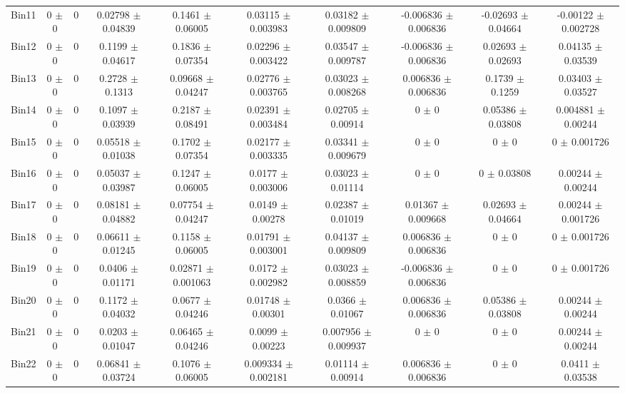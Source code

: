 \begin{tabular}{@{\extracolsep{4pt}}lccccccccc@{}}
     Bin11 & 0 $\pm$ 0 & 0 & 0.02798 $\pm$ 0.04839 & 0.1461 $\pm$ 0.06005 & 0.03115 $\pm$ 0.003983 & 0.03182 $\pm$ 0.009809 & -0.006836 $\pm$ 0.006836 & -0.02693 $\pm$ 0.04664 & -0.00122 $\pm$ 0.002728 \\ 
     Bin12 & 0 $\pm$ 0 & 0 & 0.1199 $\pm$ 0.04617 & 0.1836 $\pm$ 0.07354 & 0.02296 $\pm$ 0.003422 & 0.03547 $\pm$ 0.009787 & -0.006836 $\pm$ 0.006836 & 0.02693 $\pm$ 0.02693 & 0.04135 $\pm$ 0.03539 \\ 
     Bin13 & 0 $\pm$ 0 & 0 & 0.2728 $\pm$ 0.1313 & 0.09668 $\pm$ 0.04247 & 0.02776 $\pm$ 0.003765 & 0.03023 $\pm$ 0.008268 & 0.006836 $\pm$ 0.006836 & 0.1739 $\pm$ 0.1259 & 0.03403 $\pm$ 0.03527 \\ 
     Bin14 & 0 $\pm$ 0 & 0 & 0.1097 $\pm$ 0.03939 & 0.2187 $\pm$ 0.08491 & 0.02391 $\pm$ 0.003484 & 0.02705 $\pm$ 0.00914 & 0 $\pm$ 0 & 0.05386 $\pm$ 0.03808 & 0.004881 $\pm$ 0.00244 \\ 
     Bin15 & 0 $\pm$ 0 & 0 & 0.05518 $\pm$ 0.01038 & 0.1702 $\pm$ 0.07354 & 0.02177 $\pm$ 0.003335 & 0.03341 $\pm$ 0.009679 & 0 $\pm$ 0 & 0 $\pm$ 0 & 0 $\pm$ 0.001726 \\ 
     Bin16 & 0 $\pm$ 0 & 0 & 0.05037 $\pm$ 0.03987 & 0.1247 $\pm$ 0.06005 & 0.0177 $\pm$ 0.003006 & 0.03023 $\pm$ 0.01114 & 0 $\pm$ 0 & 0 $\pm$ 0.03808 & 0.00244 $\pm$ 0.00244 \\ 
     Bin17 & 0 $\pm$ 0 & 0 & 0.08181 $\pm$ 0.04882 & 0.07754 $\pm$ 0.04247 & 0.0149 $\pm$ 0.00278 & 0.02387 $\pm$ 0.01019 & 0.01367 $\pm$ 0.009668 & 0.02693 $\pm$ 0.04664 & 0.00244 $\pm$ 0.001726 \\ 
     Bin18 & 0 $\pm$ 0 & 0 & 0.06611 $\pm$ 0.01245 & 0.1158 $\pm$ 0.06005 & 0.01791 $\pm$ 0.003001 & 0.04137 $\pm$ 0.009809 & 0.006836 $\pm$ 0.006836 & 0 $\pm$ 0 & 0 $\pm$ 0.001726 \\ 
     Bin19 & 0 $\pm$ 0 & 0 & 0.0406 $\pm$ 0.01171 & 0.02871 $\pm$ 0.001063 & 0.0172 $\pm$ 0.002982 & 0.03023 $\pm$ 0.008859 & -0.006836 $\pm$ 0.006836 & 0 $\pm$ 0 & 0 $\pm$ 0.001726 \\ 
     Bin20 & 0 $\pm$ 0 & 0 & 0.1172 $\pm$ 0.04032 & 0.0677 $\pm$ 0.04246 & 0.01748 $\pm$ 0.00301 & 0.0366 $\pm$ 0.01067 & 0.006836 $\pm$ 0.006836 & 0.05386 $\pm$ 0.03808 & 0.00244 $\pm$ 0.00244 \\ 
     Bin21 & 0 $\pm$ 0 & 0 & 0.0203 $\pm$ 0.01047 & 0.06465 $\pm$ 0.04246 & 0.0099 $\pm$ 0.00223 & 0.007956 $\pm$ 0.009937 & 0 $\pm$ 0 & 0 $\pm$ 0 & 0.00244 $\pm$ 0.00244 \\ 
     Bin22 & 0 $\pm$ 0 & 0 & 0.06841 $\pm$ 0.03724 & 0.1076 $\pm$ 0.06005 & 0.009334 $\pm$ 0.002181 & 0.01114 $\pm$ 0.00914 & 0.006836 $\pm$ 0.006836 & 0 $\pm$ 0 & 0.0411 $\pm$ 0.03538 \\ 

\end{tabular}
